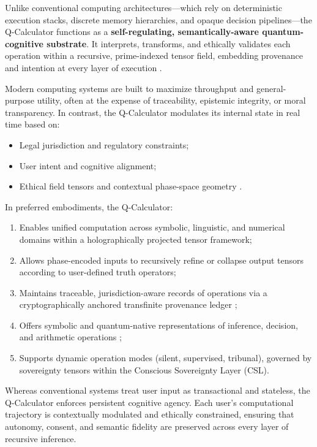 \documentclass[12pt]{article}
\begin{document}
Unlike conventional computing architectures—which rely on deterministic execution stacks, discrete memory hierarchies, and opaque decision pipelines—the Q-Calculator functions as a \textbf{self-regulating, semantically-aware quantum-cognitive substrate}. It interprets, transforms, and ethically validates each operation within a recursive, prime-indexed tensor field, embedding provenance and intention at every layer of execution \cite{nielsen2010quantum, preskill2018quantum}.

Modern computing systems are built to maximize throughput and general-purpose utility, often at the expense of traceability, epistemic integrity, or moral transparency. In contrast, the Q-Calculator modulates its internal state in real time based on:
\begin{itemize}
    \item Legal jurisdiction and regulatory constraints;
    \item User intent and cognitive alignment;
    \item Ethical field tensors and contextual phase-space geometry \cite{cohen2022ethics, barak2021machine}.
\end{itemize}

In preferred embodiments, the Q-Calculator:
\begin{enumerate}
    \item Enables unified computation across symbolic, linguistic, and numerical domains within a holographically projected tensor framework;
    \item Allows phase-encoded inputs to recursively refine or collapse output tensors according to user-defined truth operators;
    \item Maintains traceable, jurisdiction-aware records of operations via a cryptographically anchored transfinite provenance ledger \cite{gisin2002};
    \item Offers symbolic and quantum-native representations of inference, decision, and arithmetic operations \cite{aaronson2013};
    \item Supports dynamic operation modes (silent, supervised, tribunal), governed by sovereignty tensors within the Conscious Sovereignty Layer (CSL).
\end{enumerate}

Whereas conventional systems treat user input as transactional and stateless, the Q-Calculator enforces persistent cognitive agency. Each user’s computational trajectory is contextually modulated and ethically constrained, ensuring that autonomy, consent, and semantic fidelity are preserved across every layer of recursive inference.
\end{document}
